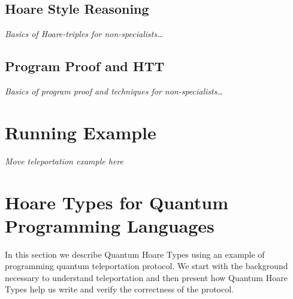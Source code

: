 \documentclass[acmsmall,nonacm,timestamp]{acmart}
\begin{document}
\subsection{Hoare Style Reasoning}
\textit{Basics of Hoare-triples for non-specialists\ldots}

\subsection{Program Proof and HTT}
\textit{Basics of program proof and techniques for non-specialists\ldots}

\section{Running Example}
\textit{Move teleportation example here}

\section{Hoare Types for Quantum Programming Languages}
In this section we describe Quantum Hoare Types using an example of programming quantum teleportation protocol. We start with the background necessary to understand teleportation and then present how Quantum Hoare Types help us write and verify the  correctness of the protocol.
\end{document}
